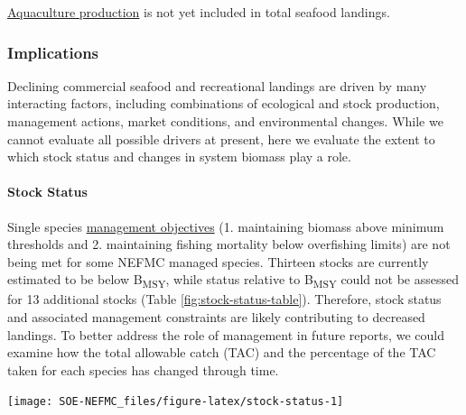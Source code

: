 \documentclass[
  10pt,
]{article}
\let\origfigure\figure
\let\endorigfigure\endfigure
\renewenvironment{figure}[1][2] {
    \expandafter\origfigure\expandafter[H]
} {
    \endorigfigure
}
\begin{document}
\href{https://noaa-edab.github.io/catalog/aquaculture-production.html}{Aquaculture production} is not yet included in total seafood landings.

\hypertarget{implications}{%
\subsubsection{Implications}\label{implications}}

Declining commercial seafood and recreational landings are driven by many interacting factors, including combinations of ecological and stock production, management actions, market conditions, and environmental changes. While we cannot evaluate all possible drivers at present, here we evaluate the extent to which stock status and changes in system biomass play a role.

\hypertarget{stock-status}{%
\paragraph{Stock Status}\label{stock-status}}

Single species \href{https://noaa-edab.github.io/catalog/stock-status.html}{management objectives} (1. maintaining biomass above minimum thresholds and 2. maintaining fishing mortality below overfishing limits) are not being met for some NEFMC managed species. Thirteen stocks are currently estimated to be below B\textsubscript{MSY}, while status relative to B\textsubscript{MSY} could not be assessed for 13 additional stocks (Table \ref{fig:stock-status-table}). Therefore, stock status and associated management constraints are likely contributing to decreased landings. To better address the role of management in future reports, we could examine how the total allowable catch (TAC) and the percentage of the TAC taken for each species has changed through time.

\begin{figure}

{\centering \texttt{[image: SOE-NEFMC\_files/figure-latex/stock-status-1]} 

}

\caption{Summary of single species status for NEFMC and jointly federally managed stocks (goosefish and spiny dogfish).  The dotted vertical line at one is the target biomass reference point of B.  The dashed lines are the management thresholds of B (vertical) or F (horizontal). Colors denote stocks with B/B\textsubscript{MSY} < 0.5 or F/F\textsubscript{MSY} (orange), stocks 0.5<B/B\textsubscript{MSY}<1 (blue), and stocks B/B\textsubscript{MSY}>1 (green).CCGOM = Cape Cod Gulf of Maine, GOM = Gulf of Maine, GB = Georges Bank, SNEMA = Southern New England Mid Atlantic}\label{fig:stock-status}
\end{figure}
\end{document}
